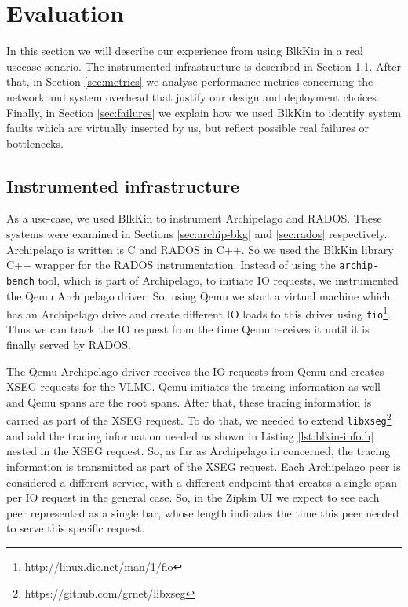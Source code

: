 \chapter{Evaluation}\label{ch:evaluation}

In this section we will describe our experience from using BlkKin in a real
usecase senario. The instrumented infrastructure is described in Section
\ref{sec:infra}. After that, in Section \ref{sec:metrics} we analyse performance
metrics concerning the network and system overhead that justify our design and
deployment choices. Finally, in Section \ref{sec:failures} we explain how we
used BlkKin to identify system faults which are virtually inserted by us, but
reflect possible real failures or bottlenecks. 


\section{Instrumented infrastructure}\label{sec:infra} As a use-case, we used
BlkKin to instrument Archipelago and RADOS. These systems were examined in
Sections \ref{sec:archip-bkg} and \ref{sec:rados} respectively. Archipelago is
written is C and RADOS in C++. So we used the BlkKin library C++ wrapper for
the RADOS instrumentation. Instead of using the \texttt{archip-bench} tool,
which is part of Archipelago, to initiate IO requests, we instrumented the Qemu
Archipelago driver. So, using Qemu we start a virtual machine which has an
Archipelago drive and create different IO loads to this driver using
\texttt{fio}\footnote{http://linux.die.net/man/1/fio}. Thus we can track the IO
request from the time Qemu receives it until it is finally served by RADOS. 

The Qemu Archipelago driver receives the IO requests from Qemu and creates XSEG
requests for the VLMC. Qemu initiates the tracing information as well and
Qemu spans are the root spans. After that, these tracing information is
carried as part of the XSEG request. To do that, we needed to extend
\texttt{libxseg}\footnote{https://github.com/grnet/libxseg} and add the
tracing information needed as shown in Listing \ref{lst:blkin-info.h} nested in
the XSEG request. So, as far as Archipelago in concerned, the tracing
information is transmitted as part of the XSEG request. Each Archipelago peer
is considered a different service, with a different endpoint that creates a
single span per IO request in the general case. So, in the Zipkin UI we expect
to see each peer represented as a single bar, whose length indicates the time
this peer needed to serve this specific request.

